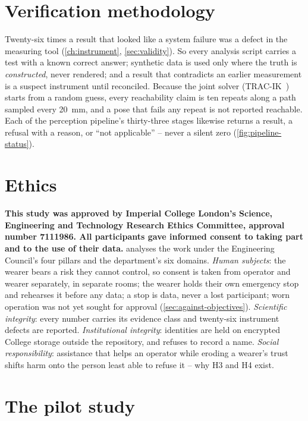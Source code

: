 \section{Verification methodology}

Twenty-six times a result that looked like a system failure was a defect in
the measuring tool (\cref{ch:instrument}, \cref{sec:validity}). So every
analysis script carries a test with a known correct answer; synthetic data
is used only where the truth is \emph{constructed}, never rendered; and a
result that contradicts an earlier measurement is a suspect instrument
until reconciled. Because the joint solver (TRAC-IK~\cite{beeson2015tracik})
starts from a random guess, every reachability claim is ten repeats along a
path sampled every \SI{20}{\milli\metre}, and a pose that fails any repeat
is not reported reachable. Each of the perception pipeline's thirty-three
stages likewise returns a result, a refusal with a reason, or ``not
applicable'' -- never a silent zero (\cref{fig:pipeline-status}).

\section{Ethics}
\label{sec:ethics}

\textbf{This study was approved by Imperial College London's Science,
Engineering and Technology Research Ethics Committee, approval number
7111986. All participants gave informed consent to taking part and to the
use of their data.}  analyses the work under the
Engineering Council's four pillars and the department's six domains.
\emph{Human subjects}: the wearer bears a risk they cannot control, so
consent is taken from operator and wearer separately, in separate rooms;
the wearer holds their own emergency stop and rehearses it before any data;
a stop is data, never a lost participant; worn operation was not yet sought
for approval (\cref{sec:against-objectives}).
\emph{Scientific integrity}: every number carries its evidence class and
twenty-six instrument defects are reported. \emph{Institutional integrity}:
identities are held on encrypted College storage outside the repository,
and  refuses to record a name. \emph{Social
responsibility}: assistance that helps an operator while eroding a wearer's
trust shifts harm onto the person least able to refuse it -- why H3 and H4
exist.

\section{The pilot study}


